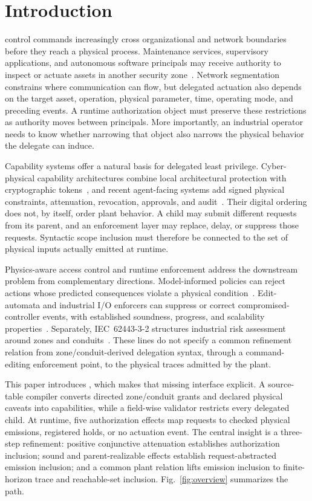 \section{Introduction}
\label{sec:introduction}

 control commands increasingly cross organizational and network boundaries before they reach a physical process. Maintenance services, supervisory applications, and autonomous software principals may receive authority to inspect or actuate assets in another security zone~\cite{iec62443}. Network segmentation constrains where communication can flow, but delegated actuation also depends on the target asset, operation, physical parameter, time, operating mode, and preceding events. A runtime authorization object must preserve these restrictions as authority moves between principals. More importantly, an industrial operator needs to know whether narrowing that object also narrows the physical behavior the delegate can induce.

Capability systems offer a natural basis for delegated least privilege. Cyber-physical capability architectures combine local architectural protection with cryptographic tokens~\cite{dodson2021,dodson2020}, and recent agent-facing systems add signed physical constraints, attenuation, revocation, approvals, and audit~\cite{sint2026,ranathunga2026,bamil2026}. Their digital ordering does not, by itself, order plant behavior. A child may submit different requests from its parent, and an enforcement layer may replace, delay, or suppress those requests. Syntactic scope inclusion must therefore be connected to the set of physical inputs actually emitted at runtime.

Physics-aware access control and runtime enforcement address the downstream problem from complementary directions. Model-informed policies can reject actions whose predicted consequences violate a physical condition~\cite{etigowni2016,rafy2026}. Edit-automata and industrial I/O enforcers can suppress or correct compromised-controller events, with established soundness, progress, and scalability properties~\cite{ligatti2005,pearce2020,lanotte2023,baird2024}. Separately, IEC~62443-3-2 structures industrial risk assessment around zones and conduits~\cite{iec62443}. These lines do not specify a common refinement relation from zone/conduit-derived delegation syntax, through a command-editing enforcement point, to the physical traces admitted by the plant.

This paper introduces \zonecap{}, which makes that missing interface explicit. A source-table compiler converts directed zone/conduit grants and declared physical caveats into capabilities, while a field-wise validator restricts every delegated child. At runtime, five authorization effects map requests to checked physical emissions, registered holds, or no actuation event. The central insight is a three-step refinement: positive conjunctive attenuation establishes authorization inclusion; sound and parent-realizable effects establish request-abstracted emission inclusion; and a common plant relation lifts emission inclusion to finite-horizon trace and reachable-set inclusion. Fig.~\ref{fig:overview} summarizes the path.

